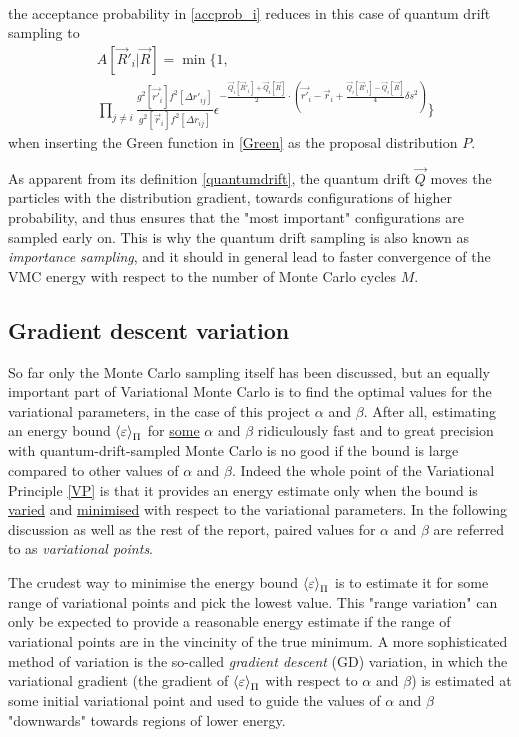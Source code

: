 \documentclass[a4paper,8pt]{article}
\begin{document}
\begin{multicols}{2}
{\begin{align}
\end{align}}%
the acceptance probability in \eqref{accprob_i} reduces in this case of quantum drift sampling to
\begin{align}
&A[\vec{R}'_i|\vec{R}] = \min\Bigg\{1, \nonumber\\
&\prod\limits_{j \neq i} \frac{g^2[\vec{r'}_i]f^2[\Delta r'_{ij}]}{g^2[\vec{r}_i]f^2[\Delta r_{ij}]}\epsilon^{-\frac{\vec{Q}_i[\vec{R}'_i]+\vec{Q}_i[\vec{R}]}{2}\cdot\left(\vec{r'}_i-\vec{r}_i+\frac{\vec{Q}_i[\vec{R}'_i]-\vec{Q}_i[\vec{R}]}{4}\delta s^2\right)}\Bigg\} \label{accprobQD}
\end{align}
when inserting the Green function in \eqref{Green} as the proposal distribution $P$.

As apparent from its definition \eqref{quantumdrift}, the quantum drift $\vec{Q}$ moves the particles with the distribution gradient, towards configurations of higher probability, and thus ensures that the "most important" configurations are sampled early on. This is why the quantum drift sampling is also known as \textit{importance sampling}, and it should in general lead to faster convergence of the VMC energy with respect to the number of Monte Carlo cycles $M$.


\subsection{Gradient descent variation}\label{gradientdescent}
So far only the Monte Carlo sampling itself has been discussed, but an equally important part of Variational Monte Carlo is to find the optimal values for the variational parameters, in the case of this project $\alpha$ and $\beta$. After all, estimating an energy bound $\ev{\varepsilon}_\Pi$ for \underline{some} $\alpha$ and $\beta$ ridiculously fast and to great precision with quantum-drift-sampled Monte Carlo is no good if the bound is large compared to other values of $\alpha$ and $\beta$. Indeed the whole point of the Variational Principle \eqref{VP} is that it provides an energy estimate only when the bound is \underline{varied} and \underline{minimised} with respect to the variational parameters. In the following discussion as well as the rest of the report, paired values for $\alpha$ and $\beta$ are referred to as \textit{variational points}.

The crudest way to minimise the energy bound $\ev{\varepsilon}_\Pi$ is to estimate it for some range of variational points and pick the lowest value. This "range variation" can only be expected to provide a reasonable energy estimate if the range of variational points are in the vincinity of the true minimum. A more sophisticated method of variation is the so-called \textit{gradient descent} (GD) variation, in which the variational gradient (the gradient of $\ev{\varepsilon}_\Pi$ with respect to $\alpha$ and $\beta$) is estimated at some initial variational point and used to guide the values of $\alpha$ and $\beta$ "downwards" towards regions of lower energy.


\end{multicols}
\end{document}
